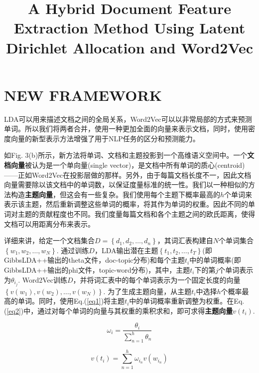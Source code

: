 \documentclass{article}
\begin{document}
\title{A Hybrid Document Feature Extraction Method Using Latent Dirichlet Allocation and Word2Vec}
\date{}
\maketitle

\section*{NEW FRAMEWORK}
LDA可以用来描述文档之间的全局关系，Word2Vec可以以非常局部的方式来预测单词。所以我们将两者合并，使用一种更加全面的向量来表示文档，同时，使用密度向量的新型表示方法增强了用于NLP任务的区分和预测能力。\par
如Fig. 3(b)所示，新方法将单词、文档和主题投影到一个高维语义空间中。一个\textbf{文档向量}被认为是一个单向量(single vector)，是文档中所有单词的质心(centroid)——正如Word2Vec在投影层做的那样。另外，由于每篇文档长度不一，因此文档向量需要除以该文档中的单词数，以保证度量标准的统一性。我们以一种相似的方法构造\textbf{主题向量}，但这会有一些复杂。我们使用每个主题下概率最高的$h$个单词来表示该主题，然后重新调整这些单词的概率，将其作为单词的权重。因此不同的单词对主题的贡献程度也不同。我们度量每篇文档和各个主题之间的欧氏距离，使得文档可以用距离分布来表示。\par
详细来讲，给定一个文档集合$D=\left\{d_1,d_2,\dots,d_n \right\}$，其词汇表构建自$N$个单词集合$\left\{w_1,w_2,\dots,w_N \right\}$. 通过训练$D$，LDA输出潜在主题$\left\{t_1,t_2,\dots,t_T \right\}$(即GibbsLDA++输出的theta文件，doc-topic分布)和每个主题$t_i$中的单词概率(即GibbsLDA++输出的phi文件，topic-word分布)，其中，主题$t_i$下的第$j$个单词表示为$\theta_{i_j}$. Word2Vec训练$D$，并将词汇表中的每个单词表示为一个固定长度的向量$\left\{v(w_1),v(w_2),\dots,v(w_N) \right\}$. 为了生成主题向量，从主题$t_i$中选择$h$个概率最高的单词。同时，使用Eq.(\ref{eq1})将主题$t_i$中的单词概率重新调整为权重。在Eq.(\ref{eq2})中，通过对每个单词的向量与其权重的乘积求和，即可求得\textbf{主题向量}$v(t_i)$.

\begin{equation}
	\omega_i=\frac{\theta_i}{\sum_{n=1}^{h}\theta_n} \label{eq1}
\end{equation}

\begin{equation}
	v(t_i)=\sum_{n=1}^{h}\omega_{i_n}v(w_{i_n}) \label{eq2}
\end{equation}
\end{document}
